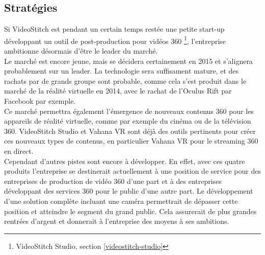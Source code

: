 \subsection{Stratégies}
Si VideoStitch est pendant un certain temps restée une petite start-up développant
un outil de post-production pour vidéos 360 
\footnote{VideoStitch Studio, section \ref{videostitch-studio}}, 
l'entreprise ambitionne désormais d'être le leader du marché.\\
Le marché est encore jeune, mais se décidera certainement en 2015 et s'alignera
probablement sur un leader. La technologie sera suffisament mature, et des rachats
par de grands groupe sont probable, comme cela s'est produit dans le marché de la
réalité virtuelle en 2014, avec le rachat de l'Oculus Rift par Facebook 
\cite{facebook-vr} par exemple.\\
Ce marché permettra également l'émergence de nouveaux contenus 360 pour les appareils
de réalité virtuelle, comme par exemple du cinéma ou de la télévision 360.
VideoStitch Studio et Vahana VR sont déjà des outils pertinents pour créer ces 
nouveaux types de contenus, en particulier Vahana VR pour le streaming 360 en direct.\\
\newline
Cependant d'autres pistes sont encore à développer. En effet, avec ces quatre produits
l'entreprise se destinerait actuellement à une position de service pour des entreprises de production
de vidéo 360 d'une part et à des entreprises développant des services 360 pour le
public d'une autre part. Le développement d'une solution complète incluant une 
caméra permettrait de dépasser cette position et atteindre le segment du grand public.
Cela assurerait de plus grandes rentrées d'argent et donnerait à l'entreprise des
moyens à ses ambitions.

